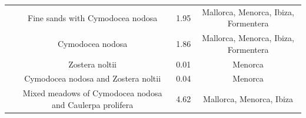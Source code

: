 \begin{table}
{\begin{tabular}{|c|c|c|c|}
            \\
                                              & Fine sands with Cymodocea
            nodosa
                                              & 1.95
                                              & Mallorca, Menorca,
            Ibiza, Formentera

            \\
                                              & Cymodocea nodosa
                                              & 1.86
                                              & Mallorca, Menorca,
            Ibiza, Formentera
            \\
                                              & Zostera noltii
                                              & 0.01
                                              & Menorca
            \\
                                              & Cymodocea nodosa and Zostera
            noltii                            & 0.04
                                              & Menorca
            \\
                                              & Mixed meadows of Cymodocea
            nodosa
            and Caulerpa prolifera            & 4.62
                                              &
            Mallorca, Menorca, Ibiza


\end{tabular}}
\end{table}
